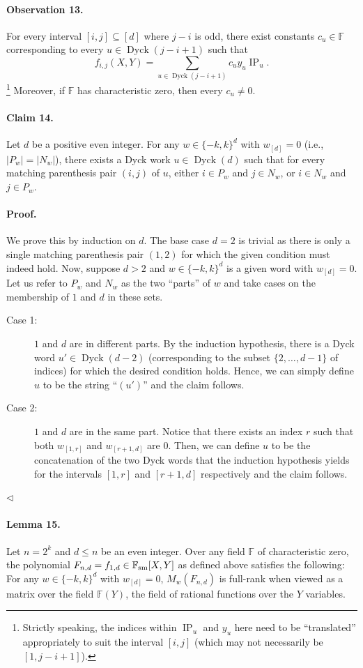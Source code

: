 \documentclass[10pt,a4paper]{article}
\begin{document}
\paragraph{Observation 13.} For every interval $[i,j]\subseteq[d]$ where $j-i$ is odd, there exist constants $c_u\in\mathbb F$ corresponding to every $u\in\operatorname{Dyck}(j-i+1)$ such that
\[f_{i,j}(X,Y)=\sum_{u\in\operatorname{Dyck}(j-i+1)}c_u y_u\operatorname{IP}_u.\]\footnote{Strictly speaking, the indices within $\operatorname{IP}_u$ and $y_u$ here need to be ``translated'' appropriately to suit the interval $[i,j]$ (which may not necessarily be $[1,j-i+1]$).}
Moreover, if $\mathbb F$ has characteristic zero, then every $c_u\neq0$.
\paragraph{Claim 14.} Let $d$ be a positive even integer. For any $w\in\{-k,k\}^d$ with $w_{[d]}=0$ (i.e., $|P_w|=|N_w|$), there exists a Dyck work $u\in\operatorname{Dyck}(d)$ such that for every matching parenthesis pair $(i,j)$ of $u$, either $i\in P_w$ and $j\in N_w$, or $i\in N_w$ and $j\in P_w$.
\paragraph{Proof.} We prove this by induction on $d$. The base case $d=2$ is trivial as there is only a single matching parenthesis pair $(1,2)$ for which the given condition must indeed hold. Now, suppose $d>2$ and $w\in\{-k,k\}^d$ is a given word with $w_{[d]}=0$. Let us refer to $P_w$ and $N_w$ as the two ``parts'' of $w$ and take cases on the membership of $1$ and $d$ in these sets.
\begin{description}
\item[Case 1:] $1$ and $d$ are in different parts. By the induction hypothesis, there is a Dyck word $u'\in\operatorname{Dyck}(d-2)$ (corresponding to the subset $\{2,\ldots,d-1\}$ of indices) for which the desired condition holds. Hence, we can simply define $u$ to be the string ``$(u')$'' and the claim follows.
\item[Case 2:] $1$ and $d$ are in the same part. Notice that there exists an index $r$ such that both $w_{[1,r]}$ and $w_{[r+1,d]}$ are $0$. Then, we can define $u$ to be the concatenation of the two Dyck words that the induction hypothesis yields for the intervals $[1,r]$ and $[r+1,d]$ respectively and the claim follows.
\end{description}\hfill$\triangleleft$
\paragraph{Lemma 15.} Let $n=2^k$ and $d\leq n$ be an even integer. Over any field $\mathbb F$ of characteristic zero, the polynomial $F_{n,d}=f_{1,d}\in\mathbb F_{\rm sm}[X,Y]$ as defined above satisfies the following: For any $w\in\{-k,k\}^d$ with $w_{[d]}=0$, $M_w(F_{n,d})$ is full-rank when viewed as a matrix over the field $\mathbb F(Y)$, the field of rational functions over the $Y$ variables.
\end{document}

